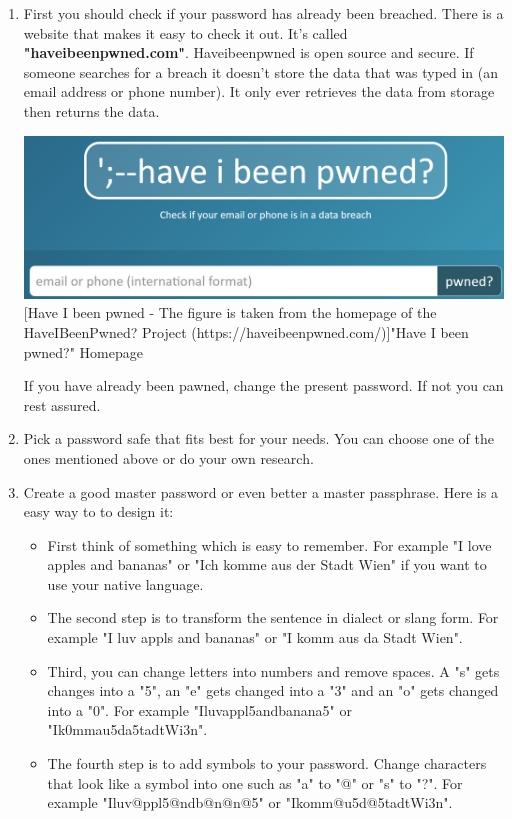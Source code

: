 \documentclass[conference]{IEEEtran}
\begin{document}
\begin{enumerate}
    \item 
        First you should check if your password has already been breached. There is a website that makes it easy to check it out. It's called \textbf{"haveibeenpwned.com"}. Haveibeenpwned is open source and secure. If someone searches for a breach it doesn't store the data that was typed in (an email address or phone number). It only ever retrieves the data from storage then returns the data. 
        \begin{center}
            \includegraphics[scale=0.29]{./images/haveibeenpwned.png}
            [Have I been pwned - The figure is taken from the homepage of the HaveIBeenPwned? Project (https://haveibeenpwned.com/)]{"Have I been pwned?" Homepage}
        \end{center}
        If you have already been pawned, change the present password. If not you can rest assured.
    \item 
        Pick a password safe that fits best for your needs. You can choose one of the ones mentioned above or do your own research.
    \item 
        Create a good master password or even better a master passphrase. Here is a easy way to to design it:
        \begin{itemize}
            \item First think of something which is easy to remember. For example "I love apples and bananas" or "Ich komme aus der Stadt Wien" if you want to use your native language.
            \item The second step is to transform the sentence in dialect or slang form. For example "I luv appls and bananas" or "I komm aus da Stadt Wien".
            \item Third, you can change letters into numbers and remove spaces. A "s" gets changes into a "5", an "e" gets changed into a "3" and an "o" gets changed into a "0". For example "Iluvappl5andbanana5" or "Ik0mmau5da5tadtWi3n".
            \item The fourth step is to add symbols to your password. Change characters that look like a symbol into one such as "a" to "@" or "s" to "?". For example "Iluv@ppl5@ndb@n@n@5" or "Ikomm@u5d@5tadtWi3n".

\end{itemize}
\end{enumerate}
\end{document}
